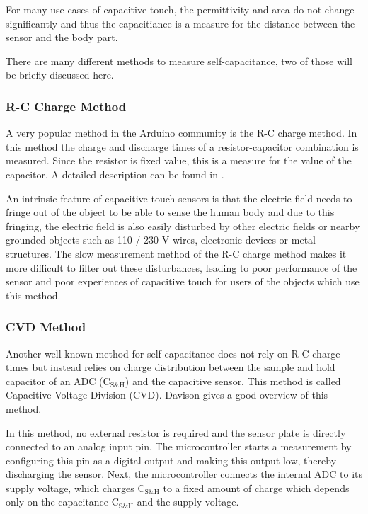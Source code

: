 \documentclass{sigchi-ext}
\begin{document}
For many use cases of capacitive touch, the permittivity and area do not change
significantly and thus the capacitiance is a measure for the distance between
the sensor and the body part.

There are many different methods to measure
self-capacitance, two of those will be briefly discussed here.

\subsubsection{R-C Charge Method}
A very popular method in the Arduino community is the R-C charge
method. In this method the charge and discharge times of a resistor-capacitor
combination is measured. Since the resistor is fixed value, this is a measure
for the value of the capacitor. A detailed description can be found in
\cite{ST2009}.

An intrinsic feature of capacitive touch sensors is that the
electric field needs to fringe out of the object to be able to sense the human
body and due to this fringing, the electric field is also easily disturbed by
other electric fields or nearby grounded objects such as 110 / 230 V wires,
electronic devices or metal structures. The slow measurement method of the R-C charge
method makes it more difficult to filter out these disturbances, leading to poor
performance of the sensor and poor experiences of capacitive touch for users of
the objects which use this method.



\subsubsection{CVD Method}
Another well-known method for self-capacitance does not rely on R-C charge times
but instead relies on charge distribution between the sample and hold capacitor
of an ADC ($\textrm{C}_{\textrm{S\&H}}$) and the capacitive sensor. This method
is called Capacitive Voltage Division (CVD). Davison \cite{Davison2013a} gives a
good overview of this method.

In this method, no external resistor is required and the sensor plate is
directly connected to an analog input pin. The microcontroller starts a
measurement by configuring this pin as a digital output and making this output low,
thereby discharging the sensor. Next, the microcontroller connects the internal
ADC to its supply voltage, which charges $\textrm{C}_{\textrm{S\&H}}$ to a fixed
amount of charge which depends only on the capacitance
$\textrm{C}_{\textrm{S\&H}}$ and the supply voltage.
\end{document}
